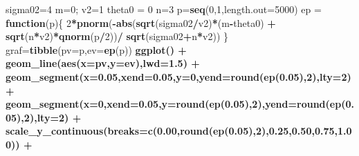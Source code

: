 \documentclass[
]{book}
\newenvironment{Shaded}{\begin{snugshade}}{\end{snugshade}}
\newcommand{\ControlFlowTok}[1]{\textcolor[rgb]{0.13,0.29,0.53}{\textbf{#1}}}
\newcommand{\DataTypeTok}[1]{\textcolor[rgb]{0.13,0.29,0.53}{#1}}
\newcommand{\DecValTok}[1]{\textcolor[rgb]{0.00,0.00,0.81}{#1}}
\newcommand{\FloatTok}[1]{\textcolor[rgb]{0.00,0.00,0.81}{#1}}
\newcommand{\KeywordTok}[1]{\textcolor[rgb]{0.13,0.29,0.53}{\textbf{#1}}}
\newcommand{\NormalTok}[1]{#1}
\newcommand{\OperatorTok}[1]{\textcolor[rgb]{0.81,0.36,0.00}{\textbf{#1}}}
\newcommand{\StringTok}[1]{\textcolor[rgb]{0.31,0.60,0.02}{#1}}
\begin{document}
\begin{Shaded}
\begin{Highlighting}[]
\NormalTok{sigma02=}\DecValTok{4}
\NormalTok{m=}\DecValTok{0}\NormalTok{; v2=}\DecValTok{1}
\NormalTok{theta0 =}\StringTok{ }\DecValTok{0}
\NormalTok{n=}\DecValTok{3}
\NormalTok{p=}\KeywordTok{seq}\NormalTok{(}\DecValTok{0}\NormalTok{,}\DecValTok{1}\NormalTok{,}\DataTypeTok{length.out=}\DecValTok{5000}\NormalTok{)}
\NormalTok{ep =}\StringTok{  }\ControlFlowTok{function}\NormalTok{(p)\{}
  \DecValTok{2}\OperatorTok{*}\KeywordTok{pnorm}\NormalTok{(}\OperatorTok{-}\KeywordTok{abs}\NormalTok{(}\KeywordTok{sqrt}\NormalTok{(sigma02}\OperatorTok{/}\NormalTok{v2)}\OperatorTok{*}\NormalTok{(m}\OperatorTok{-}\NormalTok{theta0) }\OperatorTok{+}\StringTok{ }\KeywordTok{sqrt}\NormalTok{(n}\OperatorTok{*}\NormalTok{v2)}\OperatorTok{*}\KeywordTok{qnorm}\NormalTok{(p}\OperatorTok{/}\DecValTok{2}\NormalTok{))}\OperatorTok{/}\StringTok{ }\KeywordTok{sqrt}\NormalTok{(sigma02}\OperatorTok{+}\NormalTok{n}\OperatorTok{*}\NormalTok{v2))}
\NormalTok{\}}
\NormalTok{graf=}\KeywordTok{tibble}\NormalTok{(}\DataTypeTok{pv=}\NormalTok{p,}\DataTypeTok{ev=}\KeywordTok{ep}\NormalTok{(p)) }\OperatorTok{%
\StringTok{  }\KeywordTok{ggplot}\NormalTok{() }\OperatorTok{+}
\StringTok{  }\KeywordTok{geom_line}\NormalTok{(}\KeywordTok{aes}\NormalTok{(}\DataTypeTok{x=}\NormalTok{pv,}\DataTypeTok{y=}\NormalTok{ev),}\DataTypeTok{lwd=}\FloatTok{1.5}\NormalTok{) }\OperatorTok{+}
\StringTok{  }\KeywordTok{geom_segment}\NormalTok{(}\DataTypeTok{x=}\FloatTok{0.05}\NormalTok{,}\DataTypeTok{xend=}\FloatTok{0.05}\NormalTok{,}\DataTypeTok{y=}\DecValTok{0}\NormalTok{,}\DataTypeTok{yend=}\KeywordTok{round}\NormalTok{(}\KeywordTok{ep}\NormalTok{(}\FloatTok{0.05}\NormalTok{),}\DecValTok{2}\NormalTok{),}\DataTypeTok{lty=}\DecValTok{2}\NormalTok{) }\OperatorTok{+}
\StringTok{  }\KeywordTok{geom_segment}\NormalTok{(}\DataTypeTok{x=}\DecValTok{0}\NormalTok{,}\DataTypeTok{xend=}\FloatTok{0.05}\NormalTok{,}\DataTypeTok{y=}\KeywordTok{round}\NormalTok{(}\KeywordTok{ep}\NormalTok{(}\FloatTok{0.05}\NormalTok{),}\DecValTok{2}\NormalTok{),}\DataTypeTok{yend=}\KeywordTok{round}\NormalTok{(}\KeywordTok{ep}\NormalTok{(}\FloatTok{0.05}\NormalTok{),}\DecValTok{2}\NormalTok{),}\DataTypeTok{lty=}\DecValTok{2}\NormalTok{) }\OperatorTok{+}
\StringTok{  }\KeywordTok{scale_y_continuous}\NormalTok{(}\DataTypeTok{breaks=}\KeywordTok{c}\NormalTok{(}\FloatTok{0.00}\NormalTok{,}\KeywordTok{round}\NormalTok{(}\KeywordTok{ep}\NormalTok{(}\FloatTok{0.05}\NormalTok{),}\DecValTok{2}\NormalTok{),}\FloatTok{0.25}\NormalTok{,}\FloatTok{0.50}\NormalTok{,}\FloatTok{0.75}\NormalTok{,}\FloatTok{1.00}\NormalTok{)) }\OperatorTok{+}
}
\end{Highlighting}
\end{Shaded}
\end{document}

